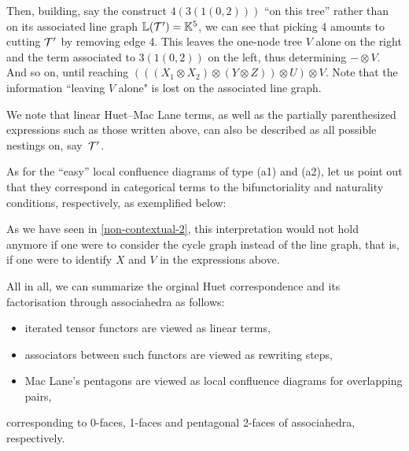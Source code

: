 Then, building, say the construct $4(3(1(0,2)))$ ``on this tree'' rather than on its associated  line graph $\mathbb{L}({\cal T}')={\mathbb K}^5$, we can see that picking 4 amounts to cutting $\cal T'$ by removing edge 4. This leaves  the one-node tree $V$ alone on the right and the term associated to $3(1(0,2))$ on the left, thus determining $-\otimes V$. And so on, until reaching $( ((X_1\otimes X_2)\otimes  (Y\otimes Z))\otimes U)\otimes V $. 
Note that the information ``leaving $V$ alone" is lost on the associated line graph. 

We note that linear Huet--Mac Lane terms, as well as the  partially parenthesized expressions such as those written above, can also be described as all possible nestings on, say~${\cal T'}$.

As for the ``easy'' local confluence diagrams of type (a1) and (a2), let us point out that they correspond in categorical terms to the bifunctoriality and naturality conditions, respectively, as exemplified below:
\begin{center}
\end{center}

\medskip

\begin{center}
\end{center}

As we have seen in \cref{non-contextual-2}, this interpretation would not hold anymore if one were to consider the cycle graph instead of the line graph, that is, if one were to identify $X$ and $V$ in the expressions above. 

\medskip
All in all, we can summarize the orginal Huet correspondence and its factorisation through associahedra as follows:
\begin{itemize}
\item[(0)] iterated tensor functors are viewed as linear terms,
\item[(1)] associators between such functors are viewed as rewriting steps,
\item[(2)] Mac Lane's pentagons are viewed as local confluence diagrams for overlapping pairs,
\end{itemize}
corresponding to 0-faces, 1-faces and pentagonal 2-faces of associahedra, respectively.

